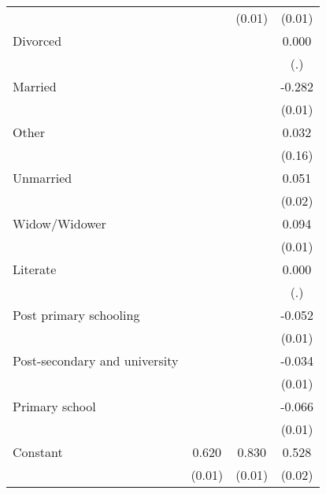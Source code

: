 {\begin{tabular}{l*{3}{c}}
                    &                     &      (0.01)         &      (0.01)         \\
Divorced            &                     &                     &       0.000         \\
                    &                     &                     &         (.)         \\
Married             &                     &                     &      -0.282\sym{***}\\
                    &                     &                     &      (0.01)         \\
Other               &                     &                     &       0.032         \\
                    &                     &                     &      (0.16)         \\
Unmarried           &                     &                     &       0.051\sym{**} \\
                    &                     &                     &      (0.02)         \\
Widow/Widower       &                     &                     &       0.094\sym{***}\\
                    &                     &                     &      (0.01)         \\
Literate            &                     &                     &       0.000         \\
                    &                     &                     &         (.)         \\
Post primary schooling&                     &                     &      -0.052\sym{***}\\
                    &                     &                     &      (0.01)         \\
Post-secondary and university&                     &                     &      -0.034\sym{**} \\
                    &                     &                     &      (0.01)         \\
Primary school      &                     &                     &      -0.066\sym{***}\\
                    &                     &                     &      (0.01)         \\
Constant            &       0.620\sym{***}&       0.830\sym{***}&       0.528\sym{***}\\
                    &      (0.01)         &      (0.01)         &      (0.02)         \\

\end{tabular}}
